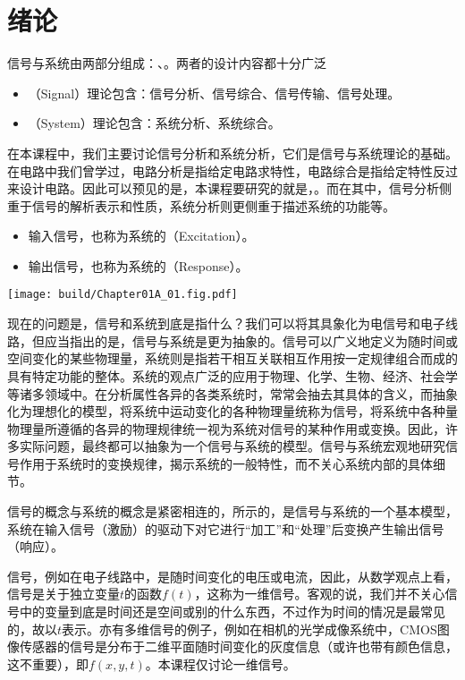 \section{绪论}
信号与系统由两部分组成：、。两者的设计内容都十分广泛
\begin{itemize}
    \item {}（Signal）理论包含：信号分析、信号综合、信号传输、信号处理。
    \item {}（System）理论包含：系统分析、系统综合。
\end{itemize}

在本课程中，我们主要讨论信号分析和系统分析，它们是信号与系统理论的基础。在电路中我们曾学过，电路分析是指给定电路求特性，电路综合是指给定特性反过来设计电路。因此可以预见的是，本课程要研究的就是，。而在其中，信号分析侧重于信号的解析表示和性质，系统分析则更侧重于描述系统的功能等。

\begin{itemize}
    \item 输入信号，也称为系统的（Excitation）。
    \item 输出信号，也称为系统的（Response）。
\end{itemize}

\begin{Figure}[信号与系统]
    \texttt{[image: build/Chapter01A\_01.fig.pdf]}
\end{Figure}

现在的问题是，信号和系统到底是指什么？我们可以将其具象化为电信号和电子线路，但应当指出的是，信号与系统是更为抽象的。信号可以广义地定义为随时间或空间变化的某些物理量，系统则是指若干相互关联相互作用按一定规律组合而成的具有特定功能的整体。系统的观点广泛的应用于物理、化学、生物、经济、社会学等诸多领域中。在分析属性各异的各类系统时，常常会抽去其具体的含义，而抽象化为理想化的模型，将系统中运动变化的各种物理量统称为信号，将系统中各种量物理量所遵循的各异的物理规律统一视为系统对信号的某种作用或变换。因此，许多实际问题，最终都可以抽象为一个信号与系统的模型。信号与系统宏观地研究信号作用于系统时的变换规律，揭示系统的一般特性，而不关心系统内部的具体细节。

信号的概念与系统的概念是紧密相连的，所示的，是信号与系统的一个基本模型，系统在输入信号（激励）的驱动下对它进行“加工”和“处理”后变换产生输出信号（响应）。


信号，例如在电子线路中，是随时间变化的电压或电流，因此，从数学观点上看，信号是关于独立变量$t$的函数$f(t)$，这称为一维信号。客观的说，我们并不关心信号中的变量到底是时间还是空间或别的什么东西，不过作为时间的情况是最常见的，故以$t$表示。亦有多维信号的例子，例如在相机的光学成像系统中，CMOS图像传感器的信号是分布于二维平面随时间变化的灰度信息（或许也带有颜色信息，这不重要），即$f(x,y,t)$。本课程仅讨论一维信号。

